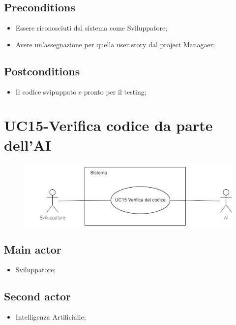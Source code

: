 \documentclass{article}
\begin{document}
    \subsection*{Preconditions}
        \begin{itemize}
            \item Essere riconosciuti dal sistema come Sviluppatore;
            \item Avere un'assegnazione per quella user story dal project Managaer;
        \end{itemize}
        
    \subsection*{Postconditions} 
        \begin{itemize}
            \item Il codice svipuppato e pronto per il testing;
        \end{itemize}
        
\section{UC15-Verifica codice da parte dell'AI}
    \begin{figure}[h]
      \centering
      \includegraphics{documenti/imgUML/UC15.png}
      \label{fig:immagine}
    \end{figure}
    
    \subsection*{Main actor}
        \begin{itemize}
            \item Sviluppatore;
        \end{itemize}
    \subsection*{Second actor}
        \begin{itemize}
            \item Intelligenza Artificialie;
        \end{itemize}
    
\end{document}

